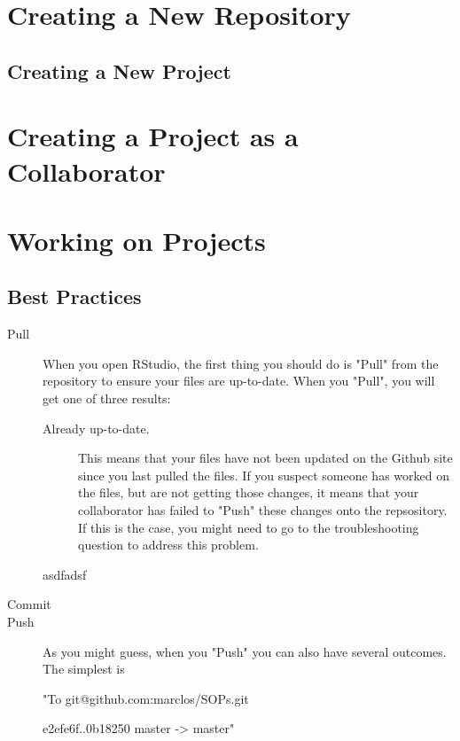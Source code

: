 \documentclass{article}
\begin{document}
\section{Creating a New Repository}

\subsection{Creating a New Project}

\section{Creating a Project as a Collaborator}


\section{Working on Projects}

\subsection{Best Practices}

\begin{description}
  \item[Pull] When you open RStudio, the first thing you should do is "Pull" from the repository to ensure your files are up-to-date. When you "Pull", you will get one of three results:
  
  \begin{description}
  \item[Already up-to-date.] This means that your files have not been updated on the Github site since you last pulled the files. If you suspect someone has worked on the files, but are not getting those changes, it means that your collaborator has failed to "Push" these changes onto the repsository. If this is the case, you might need to go to the troubleshooting question to address this problem.
  \item[asdfadsf]
\end{description}

  \item[Commit]
  \item[Push] As you might guess, when you "Push" you can also have several outcomes. The simplest is 
  
  "To git@github.com:marclos/SOPs.git
  
   e2efe6f..0b18250  master -> master"
   
\end{description}
\end{document}
